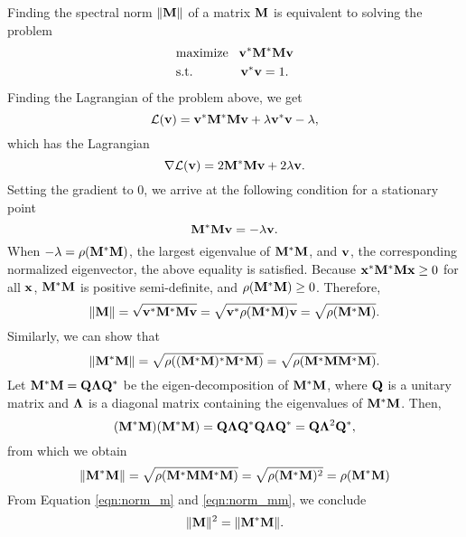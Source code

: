 \documentclass{scrartcl}
\begin{document}
Finding the spectral norm $\|\mathbf{M}\|$ of a matrix $\mathbf{M}$ is equivalent
to solving the problem
\begin{align}
\begin{split}
& \text{maximize\;\;\;} \mathbf{v}^*\mathbf{M}^*\mathbf{M}\mathbf{v} \\
& \text{s.t. \;\;\;\;\;\;\;\;\;\;\;\;} \mathbf{v}^*\mathbf{v} = 1 .
\end{split}
\end{align}
Finding the Lagrangian of the problem above, we get
\begin{equation}
	\mathcal{L}(\mathbf{v})
	= \mathbf{v}^*\mathbf{M}^*\mathbf{M}\mathbf{v}
	+\lambda \mathbf{v}^*\mathbf{v} - \lambda, 
\end{equation}
which has the Lagrangian
\begin{equation}
	\nabla \mathcal{L}(\mathbf{v})
	= 2\mathbf{M}^*\mathbf{M} \mathbf{v} + 2\lambda \mathbf{v} .
\end{equation}
Setting the gradient to 0, we arrive at the following condition for a
stationary point
\begin{equation}
	\mathbf{M}^*\mathbf{M} \mathbf{v} = -\lambda \mathbf{v} .
\end{equation}
When $-\lambda = \rho(\mathbf{M}^*\mathbf{M})$, the largest eigenvalue of
$\mathbf{M}^*\mathbf{M}$, and $\mathbf{v}$, the corresponding normalized eigenvector,
the above equality is satisfied. Because $\mathbf{x}^*\mathbf{M}^*\mathbf{M}\mathbf{x}\ge 0$
for all $\mathbf{x}$, $\mathbf{M}^*\mathbf{M}$ is positive semi-definite,
and $\rho(\mathbf{M}^*\mathbf{M}) \ge 0$. Therefore,
\begin{equation}
	\|\mathbf{M}\| = \sqrt{\mathbf{v}^*\mathbf{M}^*\mathbf{M}\mathbf{v}}
	= \sqrt{\mathbf{v}^*\rho(\mathbf{M}^*\mathbf{M})\mathbf{v}}
	= \sqrt{\rho(\mathbf{M}^*\mathbf{M})}.
\label{eqn:norm_m}
\end{equation}
Similarly, we can show that
\begin{equation}
	\|\mathbf{M}^*\mathbf{M}\| = \sqrt{\rho((\mathbf{M}^*\mathbf{M})^*\mathbf{M}^*\mathbf{M})}
	= \sqrt{\rho(\mathbf{M}^*\mathbf{M}\mathbf{M}^*\mathbf{M})}.
\end{equation}
Let $\mathbf{M}^*\mathbf{M} = \mathbf{Q}\mathbf{\Lambda}\mathbf{Q}^*$ be the eigen-decomposition
of $\mathbf{M}^*\mathbf{M}$, where $\mathbf{Q}$ is a unitary matrix and $\mathbf{\Lambda}$
is a diagonal matrix containing the eigenvalues of $\mathbf{M}^*\mathbf{M}$. Then,
\begin{equation}
	(\mathbf{M}^*\mathbf{M})(\mathbf{M}^*\mathbf{M})
	= \mathbf{Q}\mathbf{\Lambda}\mathbf{Q}^*\mathbf{Q}\mathbf{\Lambda}\mathbf{Q}^*
	= \mathbf{Q}\mathbf{\Lambda}^2\mathbf{Q}^* ,
\end{equation}
from which we obtain
\begin{equation}
	\|\mathbf{M}^*\mathbf{M}\|
	= \sqrt{\rho(\mathbf{M}^*\mathbf{M}\mathbf{M}^*\mathbf{M})}
	= \sqrt{\rho(\mathbf{M}^*\mathbf{M})^2}
	= \rho(\mathbf{M}^*\mathbf{M})
\label{eqn:norm_mm}
\end{equation}
From Equation \eqref{eqn:norm_m} and \eqref{eqn:norm_mm}, we conclude
\begin{equation}
\|\mathbf{M}\|^2 = \|\mathbf{M}^*\mathbf{M}\| .
\end{equation}
\end{document}

